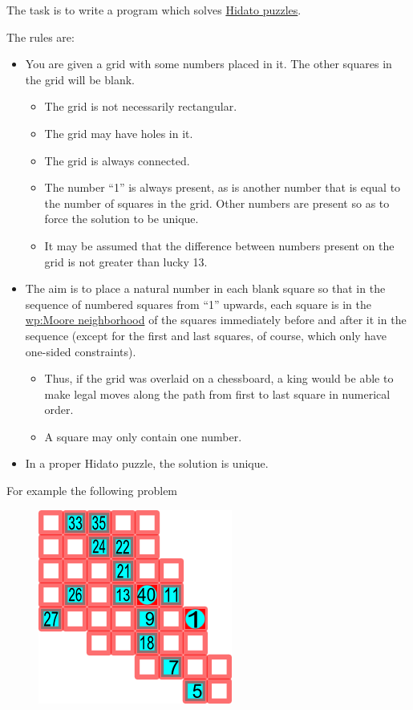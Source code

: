 The task is to write a program which solves
\href{http://en.wikipedia.org/wiki/Hidato}{Hidato puzzles}.

The rules are:

\begin{itemize}
\item
  You are given a grid with some numbers placed in it. The other squares
  in the grid will be blank.

  \begin{itemize}
  \item
    The grid is not necessarily rectangular.
  \item
    The grid may have holes in it.
  \item
    The grid is always connected.
  \item
    The number ``1'' is always present, as is another number that is
    equal to the number of squares in the grid. Other numbers are
    present so as to force the solution to be unique.
  \item
    It may be assumed that the difference between numbers present on the
    grid is not greater than lucky 13.
  \end{itemize}
\item
  The aim is to place a natural number in each blank square so that in
  the sequence of numbered squares from ``1'' upwards, each square is in
  the \href{http://en.wikipedia.org/wiki/Moore\_neighborhood}{wp:Moore
  neighborhood} of the squares immediately before and after it in the
  sequence (except for the first and last squares, of course, which only
  have one-sided constraints).

  \begin{itemize}
  \item
    Thus, if the grid was overlaid on a chessboard, a king would be able
    to make legal moves along the path from first to last square in
    numerical order.
  \item
    A square may only contain one number.
  \end{itemize}
\item
  In a proper Hidato puzzle, the solution is unique.
\end{itemize}


\pagebreak{}
For example the following problem


\begin{figure}[H]
  \centering
\includegraphics[scale=.9]{graphics/Hidato_Start.png}
\end{figure}


